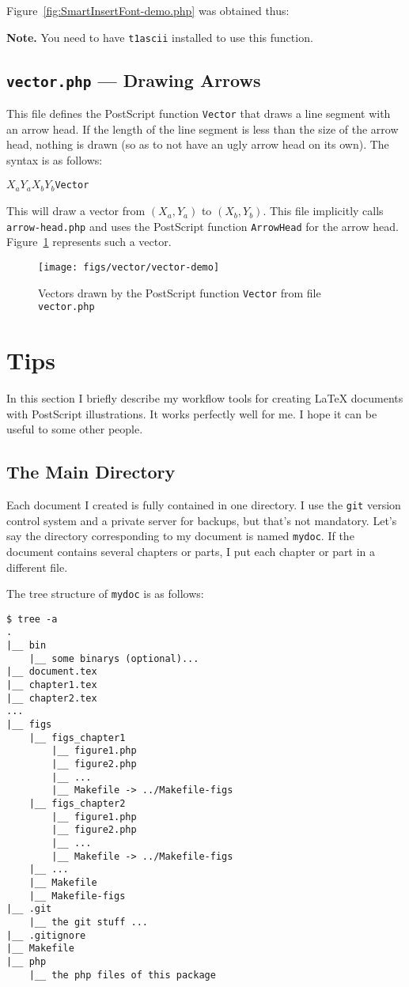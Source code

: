 \documentclass[10pt,a4paper]{scrartcl}
\newcommand\PS{PostScript}
\newenvironment{note}{\par\leavevmode\medskip\textbf{Note.} }{\par\leavevmode\medskip}
\begin{document}
Figure~\ref{fig:SmartInsertFont-demo.php} was obtained thus:


\begin{note}
You need to have \texttt{t1ascii} installed to use this function.
\end{note}

\subsection{\texttt{vector.php} --- Drawing Arrows}
\label{ssec:vector.php}
This file defines the \PS{} function \texttt{Vector} that draws a line segment
with an arrow head. If the length of the line segment is less than the size
of the arrow head, nothing is drawn (so as to not have an ugly arrow head on its own).
The syntax is as follows:
\begin{center}
$X_a$\quad$Y_a$\quad$X_b$\quad$Y_b$\quad\texttt{Vector}
\end{center}
This will draw a vector from $(X_a,Y_a)$ to $(X_b,Y_b)$. This file implicitly calls
\texttt{arrow-head.php} and uses the \PS{} function \texttt{ArrowHead} for the arrow head.
Figure~\ref{fig:vector-demo} represents such a vector.
\begin{figure}[ht!]%
\centering
\texttt{[image: figs/vector/vector-demo]}%
\caption{Vectors drawn by the \PS{} function \texttt{Vector} from file \texttt{vector.php}}%
\label{fig:vector-demo}%
\end{figure}

\section{Tips}
In this section I briefly describe my workflow tools for creating \LaTeX{}
documents with \PS{} illustrations. It works perfectly well for me. I hope it can
be useful to some other people.
\subsection{The Main Directory}
Each document I created is fully contained in one directory. I use the
\texttt{git} version control system and a private server for backups, but
that's not mandatory. Let's say the directory corresponding to my document
is named \texttt{mydoc}. If the document contains several chapters or parts,
I put each chapter or part in a different file.

The tree structure of \texttt{mydoc} is as follows:
\begin{lstlisting}
$ tree -a
.
|__ bin
    |__ some binarys (optional)...
|__ document.tex
|__ chapter1.tex
|__ chapter2.tex
...
|__ figs
    |__ figs_chapter1
        |__ figure1.php
        |__ figure2.php
        |__ ...
        |__ Makefile -> ../Makefile-figs
    |__ figs_chapter2
        |__ figure1.php
        |__ figure2.php
        |__ ...
        |__ Makefile -> ../Makefile-figs
    |__ ...
    |__ Makefile
    |__ Makefile-figs
|__ .git
    |__ the git stuff ...
|__ .gitignore
|__ Makefile
|__ php
    |__ the php files of this package
\end{lstlisting}
\end{document}
